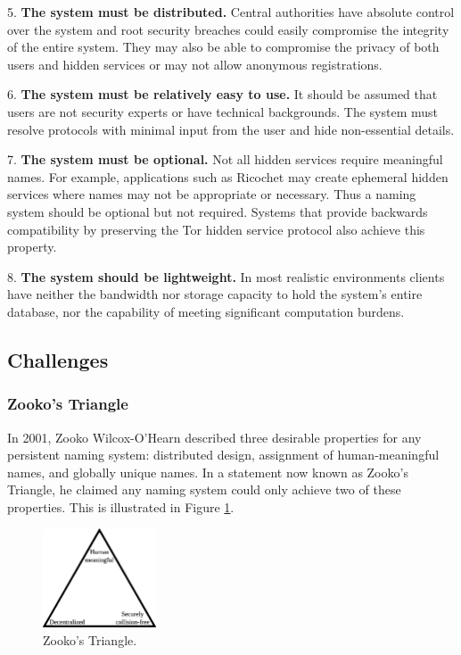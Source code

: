 \documentclass[conference]{IEEEtran}
\begin{document}
5. \textbf{The system must be distributed.} Central authorities have absolute control over the system and root security breaches could easily compromise the integrity of the entire system. They may also be able to compromise the privacy of both users and hidden services or may not allow anonymous registrations.

6. \textbf{The system must be relatively easy to use.} It should be assumed that users are not security experts or have technical backgrounds. The system must resolve protocols with minimal input from the user and hide non-essential details.

7. \textbf{The system must be optional.} Not all hidden services require meaningful names. For example, applications such as Ricochet \cite{RicochetGithub} may create ephemeral hidden services where names may not be appropriate or necessary. Thus a naming system should be optional but not required. Systems that provide backwards compatibility by preserving the Tor hidden service protocol also achieve this property.

8. \textbf{The system should be lightweight.} In most realistic environments clients have neither the bandwidth nor storage capacity to hold the system's entire database, nor the capability of meeting significant computation burdens.

\subsection{Challenges}

\subsubsection{Zooko's Triangle}
\label{sec:ZookosTriangle}

In 2001, Zooko Wilcox-O'Hearn described three desirable properties for any persistent naming system: distributed design, assignment of human-meaningful names, and globally unique names. In a statement now known as Zooko's Triangle, \cite{ferdous2009security}\cite{stiegler2005petname} he claimed any naming system could only achieve two of these properties. This is illustrated in Figure \ref{fig:ZookosTriangle}.

\begin{figure}[htbp]
	\centering
	\includegraphics[width=0.3\textwidth]{../assets/images/Zooko.eps}
	\caption{Zooko's Triangle.}
	\label{fig:ZookosTriangle}
\end{figure}
\end{document}
